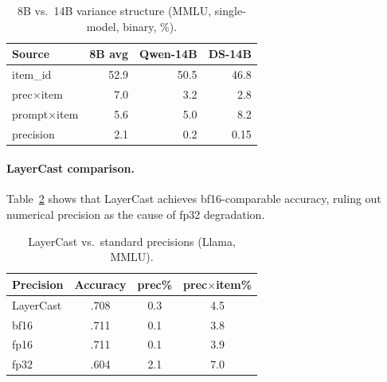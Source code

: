 \documentclass[letterpaper,11pt]{article}
\begin{document}
\begin{table}[h]
\centering
\caption{8B vs.\ 14B variance structure (MMLU, single-model, binary, \%).}
\label{tab:scale}
\small
\begin{tabular}{@{}l rrr@{}}
\toprule
Source & 8B avg & Qwen-14B & DS-14B \\
\midrule
item\_id        & 52.9 & 50.5 & 46.8 \\
prec$\times$item    &  7.0 &  3.2 &  2.8 \\
prompt$\times$item  &  5.6 &  5.0 &  8.2 \\
precision      &  2.1 &  0.2 &  0.15 \\
\bottomrule
\end{tabular}
\end{table}

\paragraph{LayerCast comparison.}
Table~\ref{tab:layercast} shows that LayerCast achieves bf16-comparable accuracy, ruling out numerical precision as the cause of fp32 degradation.

\begin{table}[h]
\centering
\caption{LayerCast vs.\ standard precisions (Llama, MMLU).}
\label{tab:layercast}
\small
\begin{tabular}{@{}l ccc@{}}
\toprule
Precision & Accuracy & prec\% & prec$\times$item\% \\
\midrule
LayerCast & .708 & 0.3 & 4.5 \\
bf16      & .711 & 0.1 & 3.8 \\
fp16      & .711 & 0.1 & 3.9 \\
fp32      & .604 & 2.1 & 7.0 \\
\bottomrule
\end{tabular}
\end{table}
\end{document}
